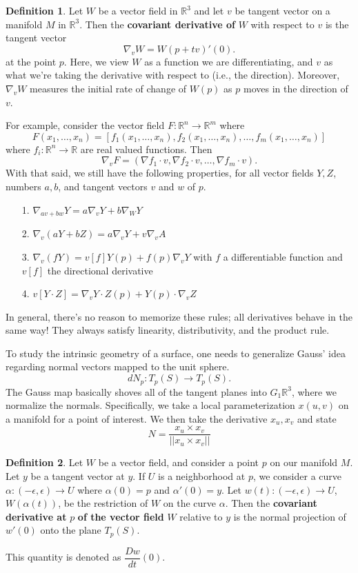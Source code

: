 \documentclass[12pt,letterpaper,boxed]{maths_v5}
\newcommand{\rr}{\mathbb{R}}
\theoremstyle{definition}
\newtheorem{definition}{Definition}[section]
\begin{document}
\begin{definition}
    Let $W$ be a vector field in $\rr^3$ and let $v$ be tangent vector on a 
    manifold $M$ in $\rr^3$. Then the \textbf{covariant derivative of} $W$ 
    with respect to $v$ is the tangent vector 
    \[
        \nabla_vW= W(p + tv)'(0).
    \]
    at the point $p$. Here, we view $W$ as a function we are differentiating, and 
    $v$ as what we're taking the derivative with respect to (i.e., the direction).
    Moreover, $\nabla_v W$ measures the initial rate of change of $W(p)$ as $p$ moves in 
    the direction of $v$. 
\end{definition}

For example, consider the vector field $F: \rr^n \to \rr^m$ where 
\[
    F(x_1, \dots, x_n) = [f_1(x_1, \dots, x_n), f_2(x_1, \dots, x_n), \dots, f_m(x_1, \dots, x_n)] 
\]
where $f_i: \rr^n \to \rr$ are real valued functions. Then 
\[
    \nabla_vF = (\nabla f_1\cdot v, \nabla f_2\cdot v, \dots, \nabla f_m\cdot v).
\]
With that said, we still have the following properties, for all 
vector fields $Y,Z$, numbers $a,b$, and tangent vectors $v$ and $w$ of $p$.
\begin{itemize}
    \item[1.] $\nabla_{av + bw}Y = a\nabla_v Y + b\nabla_W Y$
    \item[2.] $\nabla_v(aY  + bZ) = a\nabla_vY + v\nabla_v A$
    \item[3.] $\nabla_v(fY) = v[f]Y(p) + f(p)\nabla_vY$ with $f$ a differentiable function and $v[f]$ the directional derivative
    \item[4.] $v[Y\cdot Z] = \nabla_vY\cdot Z(p) + Y(p)\cdot \nabla_v Z$
\end{itemize}
In general, there's no reason to memorize these rules; all derivatives behave in the same way! 
They always satisfy linearity, distributivity, and the product rule.

To study the intrinsic geometry of a surface, one needs to generalize Gauss' idea regarding normal vectors 
mapped to the unit sphere. 
\[
    dN_p: T_p(S) \to T_p(S).   
\]
The Gauss map basically shoves all of the tangent planes 
into $G_1\rr^3$, where we normalize the normals. Specifically, 
we take a local parameterization $x(u, v)$ on a manifold for a point of interest. 
We then take the derivative $x_u, x_v$ and state 
\[
    N = \frac{x_u \times x_v}{||x_u\times x_v||} 
\] 

\begin{definition}
    Let $W$ be a vector field, and consider a point $p$ on our manifold $M$. Let $y$ 
    be a tangent vector at $y$. If $U$ is a neighborhood  at $p$, we consider a curve 
    $\alpha: (-\epsilon, \epsilon) \to U$ where $\alpha(0) = p$ and $\alpha'(0) = y$. 
    Let  $w(t): (-\epsilon, \epsilon) \to U$, $W(\alpha(t))$, be the restriction of $W$ on the curve $\alpha$. 
    Then the \textbf{covariant derivative at} $p$  \textbf{of the vector field } $W$ 
    relative to $y$ is  the normal projection of $w'(0)$ onto the plane $T_p(S)$. 
    
    This quantity  is denoted as  $\dfrac{Dw}{dt}(0)$. 
\end{definition}
\end{document}
